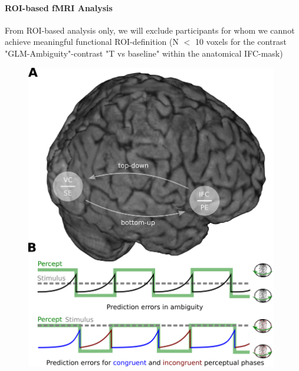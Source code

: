 \documentclass[12pt]{article}
\begin{document}
\paragraph{ROI-based fMRI Analysis}

From ROI-based analysis only, we will exclude participants for whom we cannot achieve meaningful functional ROI-definition (N $<$ 10 voxels for the contrast "GLM-Ambiguity"-contrast "T vs baseline" within the anatomical IFC-mask) 


\clearpage
\begin{figure}[h]
\begin{center}
\includegraphics[width=11cm]{Figure_1.png}
\end{center}
\end{figure}
\end{document}
